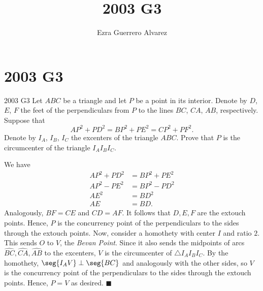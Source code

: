 \documentclass[14pt]{article}
\title{2003 G3}
\author{Ezra Guerrero Alvarez}
\begin{document}
\maketitle
	
\section*{2003 G3}

\begin{statement}{2003 G3}
	Let $ABC$ be a triangle and let $P$ be a point in its interior.  Denote by $D$, $E$, $F$ the feet of the perpendiculars from $P$ to the lines $BC$, $CA$, $AB$, respectively.  Suppose that
	\[ AP^2 + PD^2 = BP^2 + PE^2 = CP^2 + PF^2. \]
	Denote by $I_A$, $I_B$, $I_C$ the excenters of the triangle $ABC$.  Prove that $P$ is the circumcenter of the triangle $I_AI_BI_C$.
\end{statement}
We have
\begin{align*}
AP^2 + PD^2 &= BP^2 + PE^2 \\
AP^2 - PE^2 &= BP^2 - PD^2 \\
AE^2 &= BD^2 \\
AE &= BD.
\end{align*}
Analogously, $BF = CE$ and $CD = AF$. It follows that $D,E,F$ are the extouch points. Hence, $P$ is the concurrency point of the perpendiculars to the sides through the extouch points. Now, consider a homothety with center $I$ and ratio $2$. This sends $O$ to $V$, the \emph{Bevan Point}. Since it also sends the midpoints of arcs $\widehat{BC},\widehat{CA},\widehat{AB}$ to the excenters, $V$ is the circumcenter of $\triangle I_AI_BI_C$. By the homothety, $\seg{I_AV}\perp\seg{BC}$ and analogously with the other sides, so $V$ is the concurrency point of the perpendiculars to the sides through the extouch points. Hence, $P=V$ as desired. $\blacksquare$
	
\end{document}
